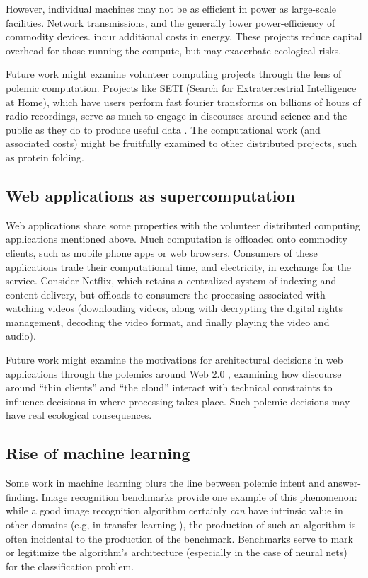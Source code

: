 \documentclass[sigconf]{acmart}
\begin{document}
However, individual machines may not be as efficient in power 
as large-scale facilities.
Network transmissions, and the generally lower power-efficiency of commodity devices.
incur additional costs in energy.
These projects reduce capital overhead for those running the compute,
but may exacerbate ecological risks.

Future work might examine volunteer computing projects through the lens of polemic computation.
Projects like SETI (Search for Extraterrestrial Intelligence at Home), which have users perform fast fourier transforms on billions of hours of radio recordings,
serve as much to engage in discourses around science and the public as they do to produce useful data 
\cite{Anderson2004}.
The computational work (and associated costs) might be fruitfully examined to other distributed projects, 
such as protein folding.


\subsection{Web applications as supercomputation}
\label{sec:org143c2b4}

Web applications share some properties with the volunteer distributed computing applications mentioned above.
Much computation is offloaded onto commodity clients, such as mobile phone apps or web browsers.
Consumers of these applications trade their computational time, and electricity, in exchange for the service.
Consider Netflix, which retains a centralized system of indexing and content delivery,
but offloads to consumers the processing associated with watching videos 
(downloading videos, along with decrypting the digital rights management, decoding the video format, and finally playing the video and audio).

Future work might examine the motivations for architectural decisions in web applications through 
the polemics around Web 2.0 
\cite{Scholz2008},
examining how discourse around ``thin clients'' and ``the cloud''
interact with technical constraints
to influence decisions in where processing takes place.
Such polemic decisions may have real ecological consequences.


\subsection{Rise of machine learning}
\label{sec:org165f7b3}

Some work in machine learning blurs the line 
between polemic intent and answer-finding.
Image recognition benchmarks provide one example of this phenomenon:
while a good image recognition algorithm certainly \emph{can} have intrinsic value in other domains 
(e.g, in transfer learning \cite{Jean2016f}),
the production of such an algorithm is often incidental to the production of the benchmark.
Benchmarks serve to mark or legitimize the algorithm's architecture (especially in the case of neural nets)
for the classification problem.
\end{document}
